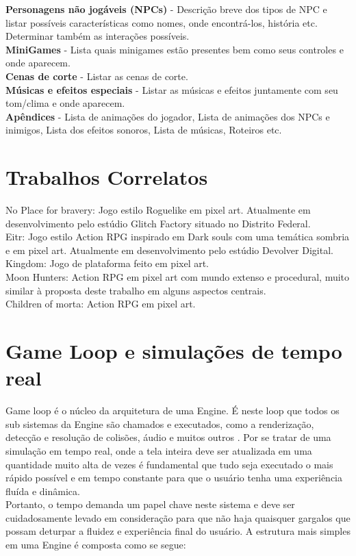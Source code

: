 \documentclass[12pt, 
openright, 
oneside, 
a4paper,    
brazil]{facom-ufu-abntex2}
\begin{document}
\textbf{Personagens não jogáveis (NPCs)} - Descrição breve dos tipos de NPC e listar possíveis características como nomes, onde encontrá-los, história etc. Determinar também as interações possíveis.\\
\textbf{MiniGames} - Lista quais minigames estão presentes bem como seus controles e onde aparecem.\\
\textbf{Cenas de corte} - Listar as cenas de corte.\\
\textbf{Músicas e efeitos especiais} - Listar as músicas e efeitos juntamente com seu tom/clima e onde aparecem.\\
\textbf{Apêndices} - Lista de animações do jogador, Lista de animações dos NPCs e inimigos, Lista dos efeitos sonoros, Lista de músicas, Roteiros etc.

\chapter{Trabalhos Correlatos}
\label{sec:trabcorr}

No Place for bravery: Jogo estilo Roguelike em pixel art. Atualmente em desenvolvimento pelo estúdio Glitch Factory situado no Distrito Federal.\\

Eitr: Jogo estilo Action RPG inspirado em Dark souls com uma temática sombria e em pixel art. Atualmente em desenvolvimento pelo estúdio Devolver Digital.\\

Kingdom: Jogo de plataforma feito em pixel art. \\

Moon Hunters: Action RPG em pixel art com mundo extenso e procedural, muito similar à proposta deste trabalho em alguns aspectos centrais. \\

Children of morta: Action RPG em pixel art. \\


\chapter{Game Loop e simulações de tempo real}
Game loop é o núcleo da arquitetura de uma Engine. É neste loop que todos os sub sistemas da Engine são chamados e  executados, como a renderização, detecção e resolução de colisões, áudio e muitos outros \cite{GameEngineArchitecture}. Por se tratar de uma simulação em tempo real, onde a tela inteira deve ser atualizada em uma quantidade muito alta de vezes é fundamental que tudo seja executado o mais rápido possível e em tempo constante para que o usuário tenha uma experiência fluída e dinâmica.\\
Portanto, o tempo demanda um papel chave neste sistema e deve ser cuidadosamente levado em consideração para que não haja quaisquer gargalos que possam deturpar a fluidez e experiência final do usuário. A estrutura mais simples em uma Engine é composta como se segue:\\
\end{document}
